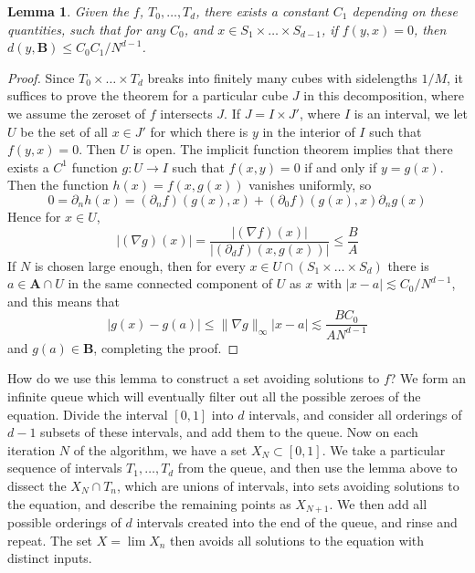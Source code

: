 \documentclass{report}
\theoremstyle{plain}
\newtheorem{lemma}{Lemma}
\theoremstyle{plain}
\begin{document}
\begin{lemma}
    Given the $f$, $T_0, \dots, T_d$, there exists a constant $C_1$ depending on these quantities, such that for any $C_0$, and $x \in S_1 \times \dots \times S_{d-1}$, if $f(y,x) = 0$, then $d(y, \mathbf{B}) \leq C_0C_1/N^{d-1}$.
\end{lemma}
\begin{proof}
    Since $T_0 \times \dots \times T_d$ breaks into finitely many cubes with sidelengths $1/M$, it suffices to prove the theorem for a particular cube $J$ in this decomposition, where we assume the zeroset of $f$ intersects $J$. If $J = I \times J'$, where $I$ is an interval, we let $U$ be the set of all $x \in J'$ for which there is $y$ in the interior of $I$ such that $f(y,x) = 0$. Then $U$ is open. The implicit function theorem implies that there exists a $C^1$ function $g: U \to I$ such that $f(x,y) = 0$ if and only if $y = g(x)$. Then the function $h(x) = f(x,g(x))$ vanishes uniformly, so
    \[ 0 = \partial_n h(x) = (\partial_n f) (g(x),x) + (\partial_0 f) (g(x),x) \partial_n g(x) \]
    Hence for $x \in U$,
    \[ |(\nabla g)(x)| = \frac{|(\nabla f)(x)|}{|(\partial_d f)(x,g(x))|} \leq \frac{B}{A} \]
    If $N$ is chosen large enough, then for every $x \in U \cap (S_1 \times \dots \times S_d)$ there is $a \in \mathbf{A} \cap U$ in the same connected component of $U$ as $x$ with $|x - a| \lesssim C_0/N^{d-1}$, and this means that
    \[ |g(x) - g(a)| \leq \| \nabla g \|_\infty |x - a| \lesssim \frac{BC_0}{A N^{d-1}} \]
    and $g(a) \in \mathbf{B}$, completing the proof.
\end{proof}

How do we use this lemma to construct a set avoiding solutions to $f$? We form an infinite queue which will eventually filter out all the possible zeroes of the equation. Divide the interval $[0,1]$ into $d$ intervals, and consider all orderings of $d - 1$ subsets of these intervals, and add them to the queue. Now on each iteration $N$ of the algorithm, we have a set $X_N \subset [0,1]$. We take a particular sequence of intervals $T_1, \dots, T_d$ from the queue, and then use the lemma above to dissect the $X_N \cap T_n$, which are unions of intervals, into sets avoiding solutions to the equation, and describe the remaining points as $X_{N+1}$. We then add all possible orderings of $d$ intervals created into the end of the queue, and rinse and repeat. The set $X = \lim X_n$ then avoids all solutions to the equation with distinct inputs.
\end{document}
